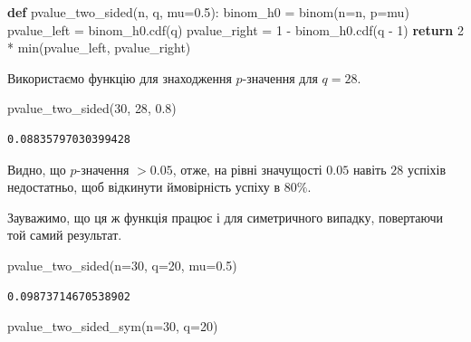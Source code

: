 \documentclass[
  letterpaper,
  10pt,
  openany]{report}
\newenvironment{Shaded}{\begin{snugshade}}{\end{snugshade}}
\newcommand{\BuiltInTok}[1]{\textcolor[rgb]{0.00,0.23,0.31}{#1}}
\newcommand{\ControlFlowTok}[1]{\textcolor[rgb]{0.00,0.23,0.31}{\textbf{#1}}}
\newcommand{\DecValTok}[1]{\textcolor[rgb]{0.68,0.00,0.00}{#1}}
\newcommand{\FloatTok}[1]{\textcolor[rgb]{0.68,0.00,0.00}{#1}}
\newcommand{\KeywordTok}[1]{\textcolor[rgb]{0.00,0.23,0.31}{\textbf{#1}}}
\newcommand{\NormalTok}[1]{\textcolor[rgb]{0.00,0.23,0.31}{#1}}
\newcommand{\OperatorTok}[1]{\textcolor[rgb]{0.37,0.37,0.37}{#1}}
\theoremstyle{definition}
\theoremstyle{remark}
\begin{document}
\begin{Shaded}
\begin{Highlighting}[]
\KeywordTok{def}\NormalTok{ pvalue\_two\_sided(n, q, mu}\OperatorTok{=}\FloatTok{0.5}\NormalTok{):}
\NormalTok{    binom\_h0 }\OperatorTok{=}\NormalTok{ binom(n}\OperatorTok{=}\NormalTok{n, p}\OperatorTok{=}\NormalTok{mu)}
\NormalTok{    pvalue\_left }\OperatorTok{=}\NormalTok{ binom\_h0.cdf(q)}
\NormalTok{    pvalue\_right }\OperatorTok{=} \DecValTok{1} \OperatorTok{{-}}\NormalTok{ binom\_h0.cdf(q }\OperatorTok{{-}} \DecValTok{1}\NormalTok{)}
    \ControlFlowTok{return} \DecValTok{2} \OperatorTok{*} \BuiltInTok{min}\NormalTok{(pvalue\_left, pvalue\_right)}
\end{Highlighting}
\end{Shaded}

Використаємо функцію для знаходження \(p\)-значення для \(q = 28\).

\begin{Shaded}
\begin{Highlighting}[]
\NormalTok{pvalue\_two\_sided(}\DecValTok{30}\NormalTok{, }\DecValTok{28}\NormalTok{, }\FloatTok{0.8}\NormalTok{)}
\end{Highlighting}
\end{Shaded}

\begin{verbatim}
0.08835797030399428
\end{verbatim}

Видно, що \(p\)-значення \(> 0.05\), отже, на рівні значущості \(0.05\)
навіть \(28\) успіхів недостатньо, щоб відкинути ймовірність успіху в
\(80\%\).

Зауважимо, що ця ж функція працює і для симетричного випадку, повертаючи
той самий результат.

\begin{Shaded}
\begin{Highlighting}[]
\NormalTok{pvalue\_two\_sided(n}\OperatorTok{=}\DecValTok{30}\NormalTok{, q}\OperatorTok{=}\DecValTok{20}\NormalTok{, mu}\OperatorTok{=}\FloatTok{0.5}\NormalTok{)}
\end{Highlighting}
\end{Shaded}

\begin{verbatim}
0.09873714670538902
\end{verbatim}

\begin{Shaded}
\begin{Highlighting}[]
\NormalTok{pvalue\_two\_sided\_sym(n}\OperatorTok{=}\DecValTok{30}\NormalTok{, q}\OperatorTok{=}\DecValTok{20}\NormalTok{)}
\end{Highlighting}
\end{Shaded}
\end{document}
